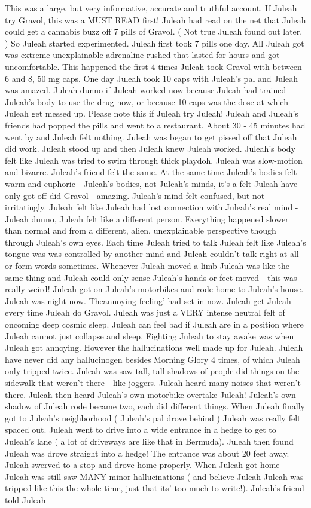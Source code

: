 \documentclass[12pt]{book}
\begin{document}
This was a large, but very informative, accurate and truthful account. If Juleah try Gravol, this was a MUST READ first! Juleah had read on the net that Juleah could get a cannabis buzz off 7 pills of Gravol. ( Not true Juleah found out later. ) So Juleah started experimented. Juleah first took 7 pills one day. All Juleah got was extreme unexplainable adrenaline rushed that lasted for hours and got uncomfortable. This happened the first 4 times Juleah took Gravol with between 6 and 8, 50 mg caps. One day Juleah took 10 caps with Juleah's pal and Juleah was amazed. Juleah dunno if Juleah worked now because Juleah had trained Juleah's body to use the drug now, or because 10 caps was the dose at which Juleah get messed up. Please note this if Juleah try Juleah! Juleah and Juleah's friends had popped the pills and went to a restaurant. About 30 - 45 minutes had went by and Juleah felt nothing. Juleah was began to get pissed off that Juleah did work. Juleah stood up and then Juleah knew Juleah worked. Juleah's body felt like Juleah was tried to swim through thick playdoh. Juleah was slow-motion and bizarre. Juleah's friend felt the same. At the same time Juleah's bodies felt warm and euphoric - Juleah's bodies, not Juleah's minds, it's a felt Juleah have only got off did Gravol - amazing. Juleah's mind felt confused, but not irritatingly. Juleah felt like Juleah had lost connection with Juleah's real mind - Juleah dunno, Juleah felt like a different person. Everything happened slower than normal and from a different, alien, unexplainable perspective though through Juleah's own eyes. Each time Juleah tried to talk Juleah felt like Juleah's tongue was was controlled by another mind and Juleah couldn't talk right at all or form words sometimes. Whenever Juleah moved a limb Juleah was like the same thing and Juleah could only sense Juleah's hands or feet moved - this was really weird! Juleah got on Juleah's motorbikes and rode home to Juleah's house. Juleah was night now. Theannoying feeling' had set in now. Juleah get Juleah every time Juleah do Gravol. Juleah was just a VERY intense neutral felt of oncoming deep cosmic sleep. Juleah can feel bad if Juleah are in a position where Juleah cannot just collapse and sleep. Fighting Juleah to stay awake was when Juleah got annoying. However the hallucinations well made up for Juleah. Juleah have never did any hallucinogen besides Morning Glory 4 times, of which Juleah only tripped twice. Juleah was saw tall, tall shadows of people did things on the sidewalk that weren't there - like joggers. Juleah heard many noises that weren't there. Juleah then heard Juleah's own motorbike overtake Juleah! Juleah's own shadow of Juleah rode became two, each did different things. When Juleah finally got to Juleah's neighborhood ( Juleah's pal drove behind ) Juleah was really felt spaced out. Juleah went to drive into a wide entrance in a hedge to get to Juleah's lane ( a lot of driveways are like that in Bermuda). Juleah then found Juleah was drove straight into a hedge! The entrance was about 20 feet away. Juleah swerved to a stop and drove home properly. When Juleah got home Juleah was still saw MANY minor hallucinations ( and believe Juleah Juleah was tripped like this the whole time, just that its' too much to write!). Juleah's friend told Juleah 
\end{document}
